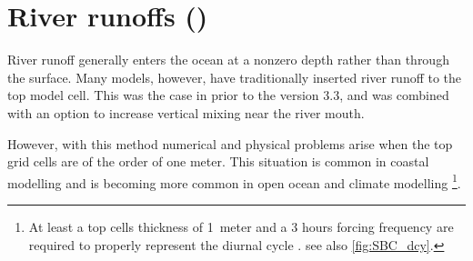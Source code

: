 \documentclass[../tex_main/NEMO_manual]{subfiles}
\begin{document}
\section{River runoffs (\protect{})}
\label{sec:SBC_rnf}






River runoff generally enters the ocean at a nonzero depth rather than through the surface.
Many models, however, have traditionally inserted river runoff to the top model cell.
This was the case in \NEMO prior to the version 3.3, and was combined with an option 
to increase vertical mixing near the river mouth.

However, with this method numerical and physical problems arise when the top grid cells are 
of the order of one meter. This situation is common in coastal modelling and is becoming 
more common in open ocean and climate modelling 
\footnote{At least a top cells thickness of 1~meter and a 3 hours forcing frequency are
required to properly represent the diurnal cycle \citep{Bernie_al_JC05}. see also \autoref{fig:SBC_dcy}.}.
\end{document}
